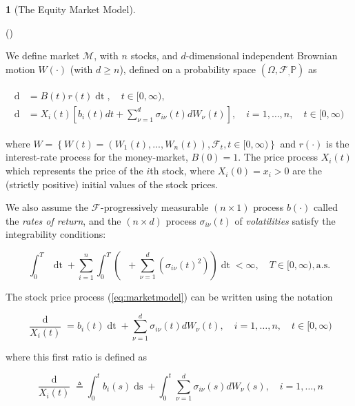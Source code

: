 \documentclass[british]{amsart}
\numberwithin{equation}{section}
\numberwithin{figure}{section}
\theoremstyle{plain}
\theoremstyle{definition}
\newtheorem{defn}[thm]{\protect\definitionname}
\theoremstyle{plain}
\theoremstyle{plain}
\theoremstyle{plain}
\theoremstyle{remark}
\theoremstyle{plain}
\providecommand{\definitionname}{Definition}
\renewcommand{\d}[1]{\mathop{\mathrm{d}{#1}}}
\newcommand{\ranget}{t\in[0,\infty)}
\newcommand{\filtration}[1]{\mathcal{F}_{#1}}
\newcommand{\defeq}{\mathop{\triangleq}}
\newcommand{\almostsurely}{\text{a.s.}}
\newcommand{\abs}[1]{\mathop{|{#1}|}}
\newcommand{\market}{\mathcal{M}}
\newcommand{\rangei}{i=1,\dots,n}
\newcommand{\measure}{\mathbb{P}}
\newcommand{\probabilityspace}{(\Omega,\filtration,\measure)}
\begin{document}
\begin{defn} [The Equity Market Model]
	\label{def:marketmodel}

 	(\cite{fernholz2009})

	We define market $\market$, with $n$ stocks, and $d$-dimensional independent Brownian 
	motion $W(\cdot)$ (with $d \ge n$), defined on a probability space 
	$\probabilityspace$ as

	\begin{gather}
		\label{eq:marketmodel}
		\begin{split}
			\d{B(t)} &= B(t)r(t)\d{t},	
				\quad \ranget, \\
			\d{X_{i}(t)} &= X_{i}(t) \left[b_{i}(t)dt + \sum_{\nu=1}^{d} \sigma_{i\nu}(t) dW_{\nu}(t)\right],
				\quad \rangei,
				\quad \ranget
		\end{split}
	\end{gather}

	where $W = \left\{ W(t)=(W_{1}(t),...,W_{n}(t)),\filtration{t},\ranget \right\}$ and $r(\cdot)$ is the interest-rate process for the money-market, $B(0)=1$. The price process $X_{i}(t)$ which represents the price of the $i$th stock, where $X_{i}(0) = x_{i} > 0$ are the (strictly positive) initial values of the stock prices.

	We also assume the $\filtration{}$-progressively measurable $(n \times 1)$ process $b(\cdot)$ called the \textit{rates of return}, and the $(n \times d)$ process $\sigma_{i\nu}(t)$ of \textit{volatilities} satisfy the integrability conditions: 

	\begin{equation*}
		\int_{0}^{T} 
		\abs{r(t)} 
		\d{t} +
		\sum_{i=1}^{n} \int_{0}^{T} 
			\left( 
					\abs{b_{i}(t)} +
					\sum_{\nu=1}^{d} ( \sigma_{i\nu}(t)^2  ) 
					\right) \d{t} < \infty,
		\quad
		T \in [0, \infty),
		\almostsurely
	 \end{equation*}

\end{defn}

The stock price process (\ref{eq:marketmodel}) can be written using the notation 

\begin{equation}
	\label{eq:stockpriceprocessdiff}
		\frac{\d{X_{i}(t)}}{X_{i}(t)} = b_{i}(t)\d{t} + \sum_{\nu=1}^{d} \sigma_{i\nu}(t) dW_{\nu}(t),
	\quad \rangei,
	\quad \ranget
\end{equation}

where this first ratio is defined as

\begin{equation*}
	\frac{\d{X_{i}(t)}}{X_{i}(t)} \defeq 
	\int_{0}^{t} b_{i}(s)\d{s} + 
	\int_{0}^{t} \sum_{\nu=1}^{d} \sigma_{i\nu}(s) dW_{\nu}(s),
	\quad \rangei
\end{equation*}
\end{document}
